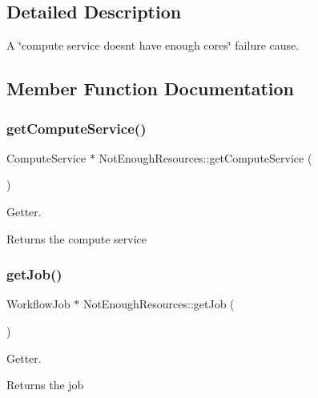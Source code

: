 \subsection{Detailed Description}
A \char`\"{}compute service doesn\textquotesingle{}t have enough cores\char`\"{} failure cause. 

\subsection{Member Function Documentation}
\mbox{\label{class_not_enough_resources_a6f2a60114e79fa4cb3cb74a920b8acb1}} 
\subsubsection{\texorpdfstring{get\+Compute\+Service()}{getComputeService()}}
{\footnotesize\ttfamily Compute\+Service $\ast$ Not\+Enough\+Resources\+::get\+Compute\+Service (\begin{DoxyParamCaption}{ }\end{DoxyParamCaption})}



Getter. 

\begin{DoxyReturn}{Returns}
the compute service 
\end{DoxyReturn}
\mbox{\label{class_not_enough_resources_aa3458ab69841bc19d08cdc9b8e4f4c70}} 
\subsubsection{\texorpdfstring{get\+Job()}{getJob()}}
{\footnotesize\ttfamily Workflow\+Job $\ast$ Not\+Enough\+Resources\+::get\+Job (\begin{DoxyParamCaption}{ }\end{DoxyParamCaption})}



Getter. 

\begin{DoxyReturn}{Returns}
the job 
\end{DoxyReturn}
\mbox{\label{class_not_enough_resources_ac892a122133e7b24af8ccf7fbd951eef}} 
